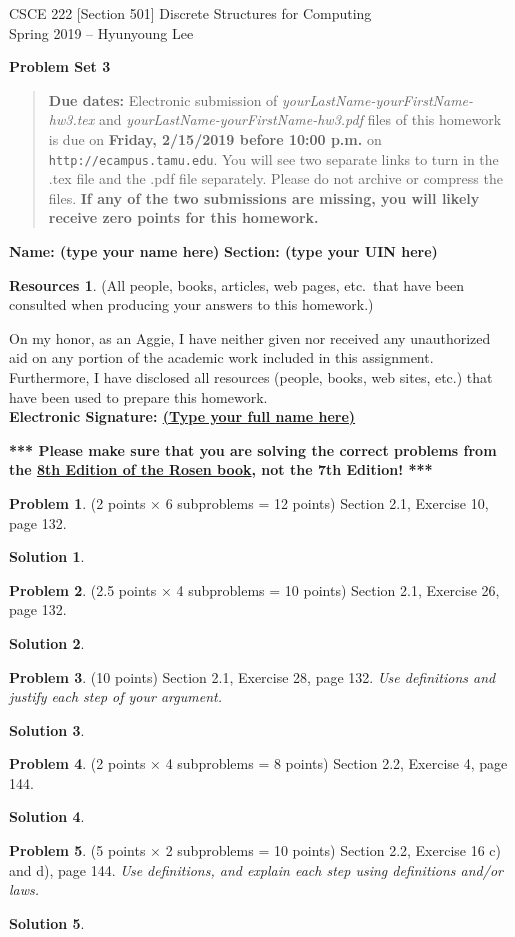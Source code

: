 \documentclass{article}
\theoremstyle{definition}
\newtheorem{problem}{Problem}
\newtheorem*{solution}{Solution}
\newtheorem*{resources}{Resources}
\newcommand{\name}[2]{\noindent\textbf{Name: #1}\hfill \textbf{Section: #2}}
\newcommand{\honor}{\noindent On my honor, as an Aggie, I have neither
  given nor received any unauthorized aid on any portion of the
  academic work included in this assignment. Furthermore, I have
  disclosed all resources (people, books, web sites, etc.) that have
  been used to prepare this homework. \\[1.5ex]
 \textbf{Electronic Signature: \underline{ (Type your full name here) } } }
\newcommand{\problemset}[1]{\begin{center}\textbf{Problem Set #1}\end{center}}
\newcommand{\duedate}[1]{\begin{quote}\textbf{Due dates:} Electronic
    submission of \textsl{yourLastName-yourFirstName-hw3.tex} and 
    \textsl{yourLastName-yourFirstName-hw3.pdf} files of this homework is due on
    \textbf{#1} on \texttt{http://ecampus.tamu.edu}. You will see two separate links
    to turn in the .tex file and the .pdf file separately. Please do not archive or compress the files.  
    \textbf{If any of the two submissions are missing, you will likely receive zero points for this 
    homework.} \end{quote} }
\begin{document}
\vspace*{-15mm}
\begin{center}
{\large
CSCE 222 [Section 501] Discrete Structures for Computing\\[.5ex]
Spring 2019 -- Hyunyoung Lee\\}
\end{center}
\problemset{3}
\duedate{Friday, 2/15/2019 before 10:00 p.m.}
\name{ (type your name here) }{ (type your UIN here) }
\begin{resources} (All people, books, articles, web pages, etc.\ that
  have been consulted when producing your answers to this homework.)
\end{resources}
\honor

\bigskip

\noindent
\textbf{*** Please make sure that you are solving the correct problems from 
the \underline{8th Edition of the Rosen book}, not the 7th Edition! ***}

\medskip

\begin{problem} (2 points $\times$ 6 subproblems = 12 points)
Section 2.1, Exercise 10, page 132.
\end{problem} 
\begin{solution}
\end{solution}

\begin{problem} (2.5 points $\times$ 4 subproblems = 10 points)
Section 2.1, Exercise 26, page 132.
\end{problem} 
\begin{solution}
\end{solution}

\begin{problem} (10 points)
Section 2.1, Exercise 28, page 132. 
\textit{Use definitions and justify each step of your argument.}
\end{problem} 
\begin{solution}
\end{solution}

\begin{problem} (2 points $\times$ 4 subproblems = 8 points) 
Section 2.2, Exercise 4, page 144. 
\end{problem}
\begin{solution}
\end{solution}

\begin{problem} (5 points $\times$ 2 subproblems = 10 points) 
Section 2.2, Exercise 16 c) and d), page 144. 
\textit{Use definitions, and explain each step using definitions and/or laws.}
\end{problem}
\begin{solution}
\end{solution}
\end{document}
